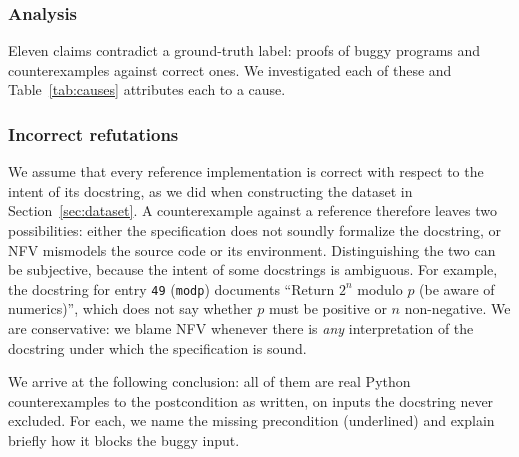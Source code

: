\documentclass[11pt,letterpaper]{article}
\newcommand{\Anbadtotal}{\ifnum\anbadtotal=11 Eleven\else\anbadtotal\fi}
\begin{document}
\subsubsection{Analysis}
\label{sec:analysis}

\Anbadtotal{} claims contradict a ground-truth label: \anverifybad{} proofs of
buggy programs and \anrefutebad{} counterexamples against correct ones. 
We investigated each of these and Table~\ref{tab:causes} attributes each to a cause.

\subsubsection{Incorrect refutations}
We assume that every reference implementation is correct with respect
to the intent of its docstring, as we did when constructing the dataset in
Section~\ref{sec:dataset}.
A counterexample against a reference therefore leaves two possibilities: either the
specification does not soundly formalize the docstring, or NFV mismodels the source
code or its environment.
Distinguishing the two can be subjective, because the intent of some docstrings is
ambiguous.
For example, the docstring for entry \texttt{49} (\texttt{modp}) documents 
``Return $2^n$ modulo $p$ (be aware of numerics)'', which does not say whether $p$ must be positive 
or $n$ non-negative.
We are conservative: we blame NFV whenever there is \emph{any} interpretation of the
docstring under which the specification is sound.



We arrive at the following conclusion: all \anrefutebad{} of them
are real Python counterexamples to the postcondition as written, on inputs the
docstring never excluded. 
For each, we name the missing precondition (underlined) and explain briefly how
it blocks the buggy input.
\end{document}
